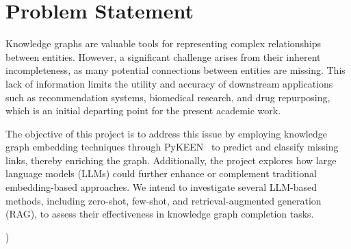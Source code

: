 \section*{Problem Statement}


Knowledge graphs are valuable tools for representing complex relationships between entities. However, a significant challenge arises from their inherent incompleteness, as many potential connections between entities are missing. This lack of information limits the utility and accuracy of downstream applications such as recommendation systems, biomedical research, and drug repurposing, which is an initial departing point for the present academic work.

The objective of this project is to address this issue by employing knowledge graph embedding techniques through PyKEEN~\cite{pykeen} to predict and classify missing links, thereby enriching the graph. Additionally, the project explores how large language models (LLMs) could further enhance or complement traditional embedding-based approaches. We intend to investigate several LLM-based methods, including zero-shot, few-shot, and retrieval-augmented generation (RAG), to assess their effectiveness in knowledge graph completion tasks.

)

